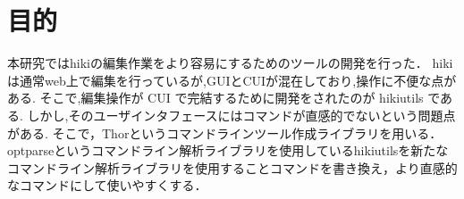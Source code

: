\section{目的}
本研究ではhikiの編集作業をより容易にするためのツールの開発を行った． 
hikiは通常web上で編集を行っているが,GUIとCUIが混在しており,操作に不便な点がある. 
そこで,編集操作が CUI で完結するために開発をされたのが hikiutils である. 
しかし,そのユーザインタフェースにはコマンドが直感的でないという問題点がある. 
そこで，Thorというコマンドラインツール作成ライブラリを用いる．
optparseというコマンドライン解析ライブラリを使用しているhikiutilsを新たなコマンドライン解析ライブラリを使用することコマンドを書き換え，より直感的なコマンドにして使いやすくする．

